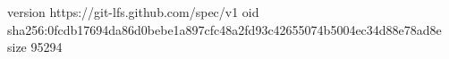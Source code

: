 version https://git-lfs.github.com/spec/v1
oid sha256:0fcdb17694da86d0bebe1a897cfc48a2fd93c42655074b5004ec34d88e78ad8e
size 95294
